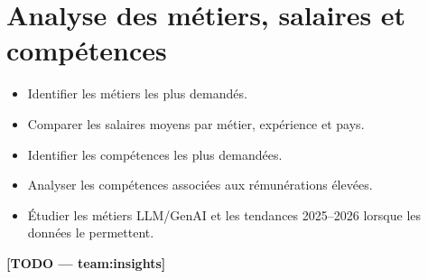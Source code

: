 \section{Analyse des métiers, salaires et compétences}
\begin{itemize}
  \item Identifier les métiers les plus demandés.
  \item Comparer les salaires moyens par métier, expérience et pays.
  \item Identifier les compétences les plus demandées.
  \item Analyser les compétences associées aux rémunérations élevées.
  \item Étudier les métiers LLM/GenAI et les tendances 2025--2026 lorsque les données le permettent.
\end{itemize}
\textbf{[TODO — team:insights]}

